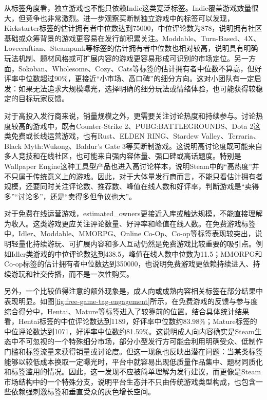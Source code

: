 \documentclass[UTF8,a4paper,12pt,fontset=fandol]{ctexart}
\begin{document}
从标签角度看，独立游戏也不能只依赖Indie这类宽泛标签。Indie覆盖游戏数量很大，但竞争也非常激烈。进一步观察买断制独立游戏中的标签可以发现，Kickstarter标签的估计拥有者中位数达到75000，中位评论数为878，说明拥有社区基础或众筹背景的游戏更容易在发行前积累关注。Moddable、Turn-Based、4X、Lovecraftian、Steampunk等标签的估计拥有者中位数也相对较高，说明具有明确玩法机制、题材风格或可扩展内容的游戏更容易形成可识别的市场定位。另一方面，Sokoban、Wholesome、Cozy、Cats等标签的估计拥有者中位数不算高，但好评率中位数超过90\%，更接近“小市场、高口碑”的细分方向。这对小团队有一定启发：如果无法追求大规模曝光，选择明确的细分玩法或情绪体验，也可能获得较稳定的目标玩家反馈。

对于高投入发行商来说，销量规模之外，更需要关注讨论热度和持续参与。讨论热度较高的游戏中，既有Counter-Strike 2、PUBG:BATTLEGROUNDS、Dota 2这类免费或长线运营游戏，也有Rust、ELDEN RING、Stardew Valley、Terraria、Black Myth:Wukong、Baldur's Gate 3等买断制游戏。这说明高讨论度既可能来自多人竞技和在线社区，也可能来自强内容体量、强口碑或高话题度。特别是Wallpaper Engine这种工具型产品也进入高讨论样本，说明Steam中的“高热度”并不只属于传统意义上的游戏。因此，对于大体量发行商而言，不能只看估计拥有者规模，还要同时关注评论数、推荐数、峰值在线人数和好评率，判断游戏是“卖得多”“讨论多”，还是“卖得多但争议也大”。

对于免费在线运营游戏，estimated\_owners更接近入库或触达规模，不能直接理解为收入。这类游戏更应关注评论数量、好评率和峰值在线人数。在免费游戏标签中，Idler、Moddable、MMORPG、Online Co-Op、Co-op等标签表现较突出，说明轻量化持续游玩、可扩展内容和多人互动仍然是免费游戏比较重要的吸引点。例如Idler类游戏的中位评论数达到438.5，峰值在线人数中位数为11.5；MMORPG和Co-op标签的估计拥有者中位数达到350000，也说明免费游戏更依赖持续进入、持续游玩和社交传播，而不是一次性购买。

另外，一个比较值得注意的额外现象是，成人向或成熟内容相关标签在部分结果中表现明显。如图\ref{fig:free-game-tag-engagement}所示，在免费游戏的反馈与参与度综合得分中，Hentai、Mature等标签进入了较靠前的位置。结合具体统计结果看，Hentai标签的中位评论数达到1189，好评率中位数约83.98\%；Mature标签的中位评论数达到1071，好评率中位数约81.59\%。这说明成人向内容确实是Steam生态中不可忽视的一个特殊细分市场，部分小型发行方可能会利用明确受众、低制作门槛和标签流量来获得销量或讨论度。但这一现象也反映出潜在问题：当某类标签能够以较低成本换取一定曝光时，平台中就容易出现低质量作品集中、题材同质化和标签滥用的情况。因此，这一发现不应被简单理解为发行建议，而更像是Steam市场结构中的一个特殊分支，说明平台生态并不只由传统游戏类型构成，也包含一些依赖强刺激标签和垂直受众的灰色增长空间。
\end{document}
